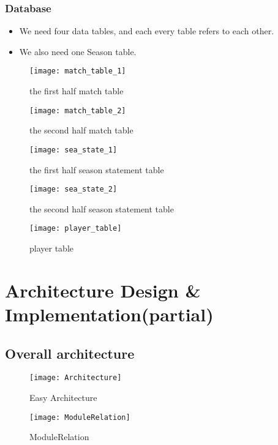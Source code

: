 \documentclass[conference,compsoc, twocolumn]{IEEEtran}
\begin{document}
\subsubsection{Database}
\begin{itemize}
\item We need four data tables, and each every table refers to each other.
\item We also need one Season table.
\end{itemize}


\begin{figure}[H]
\centering\texttt{[image: match\_table\_1]}
\caption{the first half match table}
\end{figure}

\begin{figure}[H]
\centering\texttt{[image: match\_table\_2]}
\caption{the second half match table}
\end{figure}

\begin{figure}[H]
\centering\texttt{[image: sea\_state\_1]}
\caption{the first half season statement table}
\end{figure}

\begin{figure}[H]
\centering\texttt{[image: sea\_state\_2]}
\caption{the second half season statement table}
\end{figure}

\begin{figure}[H]
\centering\texttt{[image: player\_table]}
\caption{player table}
\end{figure}




\section{Architecture Design \& Implementation(partial)}

\subsection{Overall architecture}

\begin{figure}[H]
\centering\texttt{[image: Architecture]}
\caption{Easy Architecture}
\end{figure}

\begin{figure}[H]
\centering\texttt{[image: ModuleRelation]}
\caption{ModuleRelation}
\end{figure}
\end{document}
